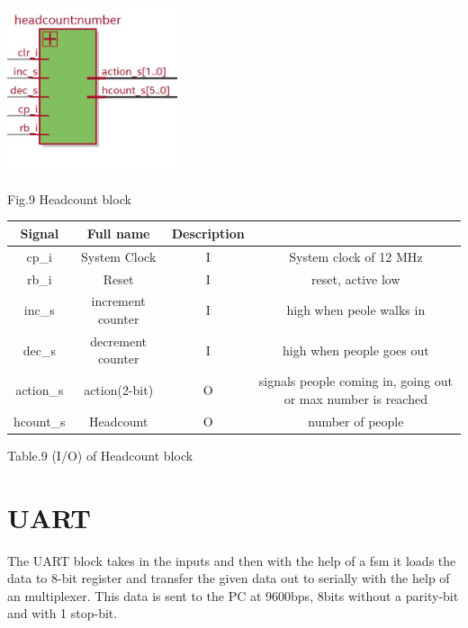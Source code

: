 \documentclass{article}
\begin{document}
\begin{center}

\includegraphics[width=5cm]{hdcnt.JPG}
\end{center}
Fig.9 Headcount block
\vspace{0.5cm}
 \begin{center}
           \begin{tabular}{|c|c|c|c|}
          \hline
        Signal & Full name & Description \\
        \hline
        \hline
        cp\_i & System Clock & I & System clock of 12 MHz \\ 
        \hline
        rb\_i & Reset & I &  reset, active low \\
        \hline 
        inc\_s &   increment counter & I &   high when peole walks in \\
        \hline
        dec\_s &   decrement counter & I &   high when people goes out \\
        \hline 
         action\_s  & action(2-bit) & O &   signals people coming in, going out or max number is reached\\
         \hline
           hcount\_s &   Headcount & O &   number of people  \\
           \hline
         
          \end{tabular}
\end{center}
Table.9 (I/O) of Headcount block


\newpage

\section{UART}
The UART block takes in  the inputs and then with the help of a fsm it loads the data to  8-bit register and transfer the given data out  to serially with the help of an multiplexer. This data is sent to the PC at 9600bps, 8bits without a parity-bit and with 1 stop-bit.
\end{document}
